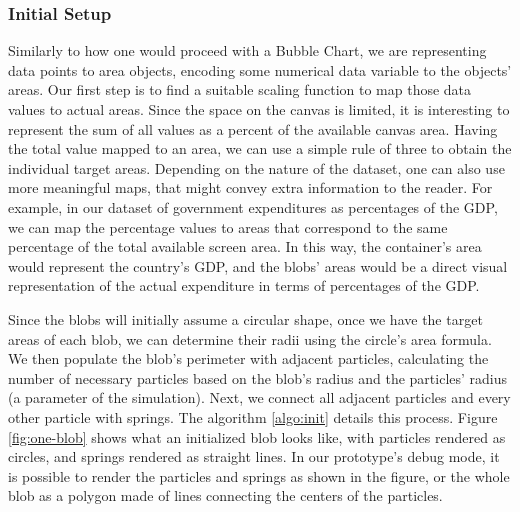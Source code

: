 \documentclass[manuscript, screen]{timtm}
\begin{document}
\subsubsection{Initial Setup}\label{section:initial-setup}

Similarly to how one would proceed with a Bubble Chart, we are representing data points to area objects, encoding some numerical data variable to the objects' areas. Our first step is to find a suitable scaling function to map those data values to actual areas. Since the space on the canvas is limited, it is interesting to represent the sum of all values as a percent of the available canvas area. Having the total value mapped to an area, we can use a simple rule of three to obtain the individual target areas. Depending on the nature of the dataset, one can also use more meaningful maps, that might convey extra information to the reader. For example, in our dataset of government expenditures as percentages of the GDP, we can map the percentage values to areas that correspond to the same percentage of the total available screen area. In this way, the container's area would represent the country's GDP, and the blobs' areas would be a direct visual representation of the actual expenditure in terms of percentages of the GDP.

Since the blobs will initially assume a circular shape, once we have the target areas of each blob, we can determine their radii using the circle's area formula. We then populate the blob's perimeter with adjacent particles, calculating the number of necessary particles based on the blob's radius and the particles' radius (a parameter of the simulation). Next, we connect all adjacent particles and every other particle with springs. The algorithm \ref{algo:init} details this process. Figure \ref{fig:one-blob} shows what an initialized blob looks like, with particles rendered as circles, and springs rendered as straight lines. In our prototype's debug mode, it is possible to render the particles and springs as shown in the figure, or the whole blob as a polygon made of lines connecting the centers of the particles.
\end{document}
